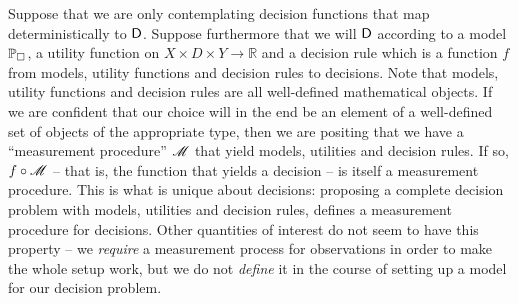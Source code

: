 Suppose that we are only contemplating decision functions that map deterministically to $\mathsf{D}$. Suppose furthermore that we will $\mathsf{D}$ according to a model $\mathbb{P}_\square$, a utility function on $X\times D\times Y\to \mathbb{R}$ and a decision rule which is a function $f$ from models, utility functions and decision rules to decisions. Note that models, utility functions and decision rules are all well-defined mathematical objects. If we are confident that our choice will in the end be an element of a well-defined set of objects of the appropriate type, then we are positing that we have a ``measurement procedure'' $\mathscr{M}$ that yield models, utilities and decision rules. If so, $f\circ \mathscr{M}$ -- that is, the function that yields a decision -- is itself a measurement procedure. This is what is unique about decisions: proposing a complete decision problem with models, utilities and decision rules, defines a measurement procedure for decisions. Other quantities of interest do not seem to have this property -- we \emph{require} a measurement process for observations in order to make the whole setup work, but we do not \emph{define} it in the course of setting up a model for our decision problem.




